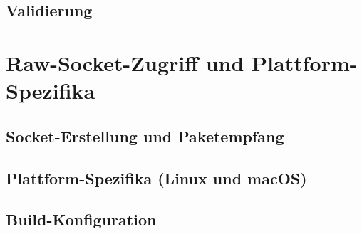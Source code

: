 \subsection{Validierung}
\label{subsec:ocs-validierung}

\section{Raw-Socket-Zugriff und Plattform-Spezifika}
\label{sec:raw-socket}

\subsection{Socket-Erstellung und Paketempfang}
\label{subsec:socket}

\subsection{Plattform-Spezifika (Linux und macOS)}
\label{subsec:plattform}

\subsection{Build-Konfiguration}
\label{subsec:build}
